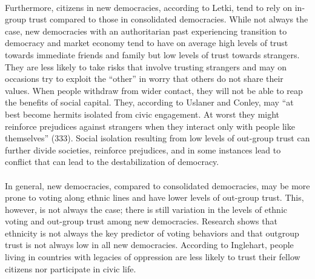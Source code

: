 \documentclass[a4paper, 12pt]{article}
\begin{document}
\paragraph{}
Furthermore, citizens in new democracies, according to Letki\cite{letkiTrustNewlyDemocratic2018}, tend to rely on in-group trust compared to those in consolidated democracies. While not always the case, new democracies with an authoritarian past experiencing transition to democracy and market economy tend to have on average high levels of trust towards immediate friends and family but low levels of trust towards strangers. They are less likely to take risks that involve trusting strangers and may on occasions try to exploit the “other” in worry that others do not share their values\cite{banfieldCorruptionFeatureGovernmental1975, uslanerCivicEngagementParticularized2016}. When people withdraw from wider contact, they will not be able to reap the benefits of social capital. They, according to Uslaner and Conley\cite{uslanerCivicEngagementParticularized2016}, may “at best become hermits isolated from civic engagement. At worst they might reinforce prejudices against strangers when they interact only with people like themselves” (333). Social isolation resulting from low levels of out-group trust can further divide societies, reinforce prejudices, and in some instances lead to conflict that can lead to the destabilization of democracy.
\paragraph{}
In general, new democracies, compared to consolidated democracies, may be more prone to voting along ethnic lines and have lower levels of out-group trust. This, however, is not always the case; there is still variation in the levels of ethnic voting and out-group trust among new democracies. Research shows that ethnicity is not always the key predictor of voting behaviors\cite{horowitzEthnicitySwingVote2019, basedauEthnicityPartyPreference2011, houleStructureEthnicInequality2018} and that outgroup trust is not always low in all new democracies. According to Inglehart\cite{inglehartTrustWellbeingDemocracy1999a}, people living in countries with legacies of oppression are less likely to trust their fellow citizens nor participate in civic life.
\end{document}
